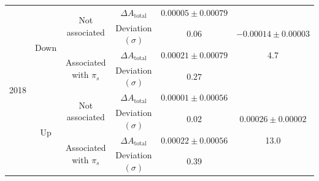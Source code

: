 \documentclass{article}
\begin{document}
\begin{center}
\begin{tabular}{c|c|c|c|c|c}
                        \multirow{8}{*}{2018} & \multirow{4}{*}{Down} & \multirow{2}{*}{Not associated} & $\Delta A_\text{total}$ & $0.00005\pm 0.00079$& \\
                        & & & Deviation $(\sigma)$ & 0.06 & $-0.00014\pm 0.00003$\\
                        \cline{3-5}
                        & & \multirow{2}{*}{Associated with $\pi_s$} & $\Delta A_\text{total}$ & $0.00021\pm 0.00079$& 4.7\\
                        & & & Deviation $(\sigma)$ & $0.27$& \\
                        \cline{2-6}
                        & \multirow{4}{*}{Up} & \multirow{2}{*}{Not associated} & $\Delta A_\text{total}$ & $0.00001\pm 0.00056$& \\
                        & & & Deviation $(\sigma)$ & 0.02& $0.00026\pm0.00002$\\
                        \cline{3-5}
                        & & \multirow{2}{*}{Associated with $\pi_s$} & $\Delta A_\text{total}$ & $0.00022\pm 0.00056$& 13.0\\
                        & & & Deviation $(\sigma)$ &0.39 & \\
                \end{tabular}
                \label{tab:all}
        \end{center}
\end{document}
